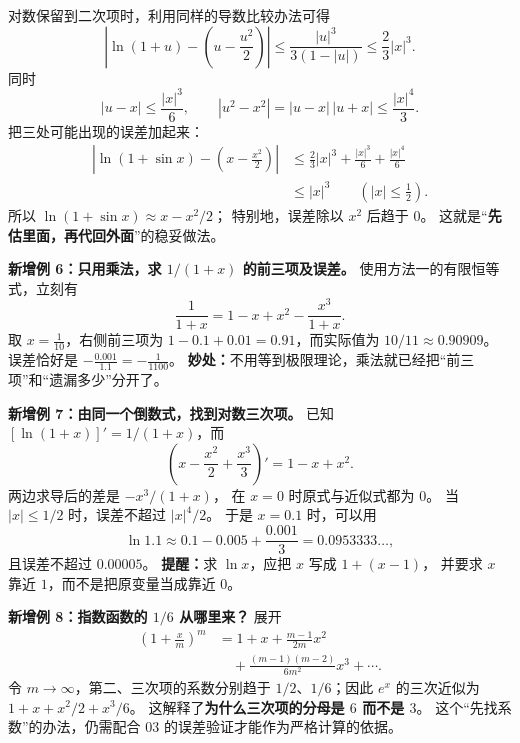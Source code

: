 \begin{examplebox}
对数保留到二次项时，利用同样的导数比较办法可得
\[
 \left|\ln(1+u)-\left(u-\frac{u^2}{2}\right)\right|
 \le\frac{|u|^3}{3(1-|u|)}
 \le\frac23|x|^3.
\]
同时
\[
 |u-x|\le\frac{|x|^3}{6},\qquad
 |u^2-x^2|=|u-x|\,|u+x|\le\frac{|x|^4}{3}.
\]
把三处可能出现的误差加起来：
\[
\begin{aligned}
\left|\ln(1+\sin x)-\left(x-\frac{x^2}{2}\right)\right|
&\le\frac23|x|^3+\frac{|x|^3}{6}+\frac{|x|^4}{6}\\
&\le|x|^3\qquad(|x|\le\tfrac12).
\end{aligned}
\]
所以 $\boxed{\ln(1+\sin x)\approx x-x^2/2}$；
特别地，误差除以 $x^2$ 后趋于 $0$。
这就是“\textbf{先估里面，再代回外面}”的稳妥做法。


\end{examplebox}

\clearpage
\begin{examplebox}
\textbf{新增例 6：只用乘法，求 $1/(1+x)$ 的前三项及误差。}
使用方法一的有限恒等式，立刻有
\[
 \frac1{1+x}=1-x+x^2-\frac{x^3}{1+x}.
\]
取 $x=\frac1{10}$，右侧前三项为
$1-0.1+0.01=0.91$，而实际值为 $10/11\approx0.90909$。
误差恰好是 $-\frac{0.001}{1.1}=-\frac1{1100}$。
\textbf{妙处：}不用等到极限理论，乘法就已经把“前三项”和“遗漏多少”分开了。

\textbf{新增例 7：由同一个倒数式，找到对数三次项。}
已知 $[\ln(1+x)]'=1/(1+x)$，而
\[
 \left(x-\frac{x^2}{2}+\frac{x^3}{3}\right)'=1-x+x^2.
\]
两边求导后的差是 $-x^3/(1+x)$，
在 $x=0$ 时原式与近似式都为 $0$。
当 $|x|\le1/2$ 时，误差不超过 $|x|^4/2$。
于是 $x=0.1$ 时，可以用
\[
 \ln1.1\approx0.1-0.005+\frac{0.001}{3}
 =0.0953333\ldots,
\]
且误差不超过 $0.00005$。
\textbf{提醒：}求 $\ln x$，应把 $x$ 写成 $1+(x-1)$，
并要求 $x$ 靠近 $1$，而不是把原变量当成靠近 $0$。

\textbf{新增例 8：指数函数的 $1/6$ 从哪里来？}
展开
\[
 \begin{aligned}
 \left(1+\frac{x}{m}\right)^m
 &=1+x+\frac{m-1}{2m}x^2\\
 &\quad+\frac{(m-1)(m-2)}{6m^2}x^3+\cdots.
 \end{aligned}
\]
令 $m\to\infty$，第二、三次项的系数分别趋于
$1/2$、$1/6$；因此 $e^x$ 的三次近似为
$1+x+x^2/2+x^3/6$。
这解释了\textbf{为什么三次项的分母是 $6$ 而不是 $3$}。
这个“先找系数”的办法，仍需配合 03 的误差验证才能作为严格计算的依据。
\end{examplebox}


